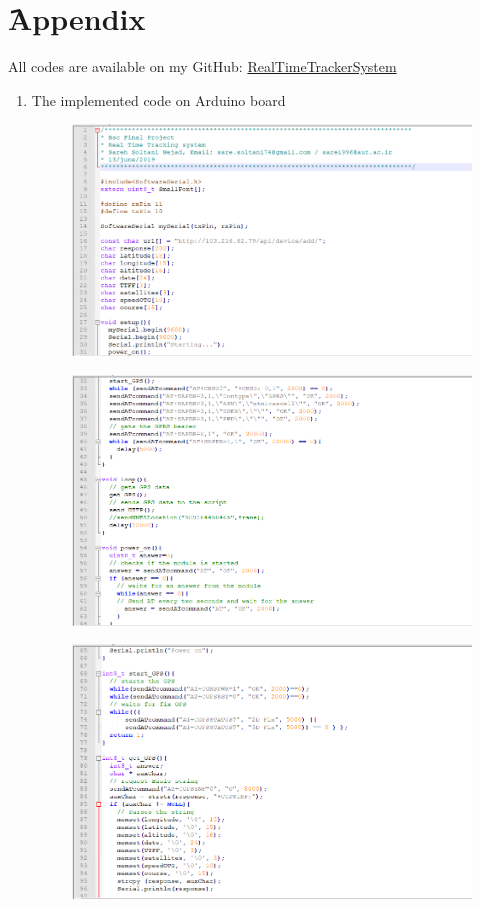 \chapter{َAppendix}
All codes are available on my GitHub:  \href{https://github.com/sarehsoltani/RealTimeTrackerSystem}{RealTimeTrackerSystem}
\begin{enumerate}
	\item The implemented code on Arduino board
	\\
	\begin{figure}[!h]
		\centerline{\includegraphics[width=1.1\textwidth]{code1}}
	\end{figure}
\newpage
	\begin{figure}[!h]
		\centerline{\includegraphics[width=1.1\textwidth]{code2}}
	\end{figure}
	\begin{figure}[!h]
		\centerline{\includegraphics[width=1.1\textwidth]{code3}}

\end{figure}
\end{enumerate}
